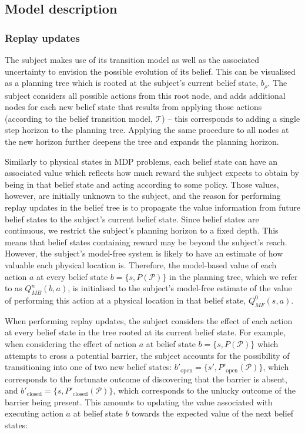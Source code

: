 \subsection*{Model description}

\subsubsection*{Replay updates}

The subject makes use of its transition model as well as the associated uncertainty to envision the possible evolution of its belief. This can be visualised as a planning tree which is rooted at the subject's current belief state, $b_\rho$. The subject considers all possible actions from this root node, and adds additional nodes for each new belief state that results from applying those actions (according to the belief transition model, $\mathcal{T}$) -- this corresponds to adding a single step horizon to the planning tree. Applying the same procedure to all nodes at the new horizon further deepens the tree and expands the planning horizon.

Similarly to physical states in MDP problems, each belief state can have an associated value which reflects how much reward the subject expects to obtain by being in that belief state and acting according to some policy. Those values, however, are initially unknown to the subject, and the reason for performing replay updates in the belief tree is to propagate the value information from future belief states to the subject's current belief state. Since belief states are continuous, we restrict the subject's planning horizon to a fixed depth. This means that belief states containing reward may be beyond the subject's reach. However, the subject's model-free system is likely to have an estimate of how valuable each physical location is. Therefore, the model-based value of each action $a$ at every belief state $b = \{ s, P(\mathcal{P}) \}$ in the planning tree, which we refer to as $Q_{MB}^n(b, a)$, is initialised to the subject's model-free estimate of the value of performing this action at a physical location in that belief state, $Q_{MF}^0(s, a)$.

When performing replay updates, the subject considers the effect of each action at every belief state in the tree rooted at its current belief state. For example, when considering the effect of action $a$ at belief state $b = \{ s, P(\mathcal{P}) \}$ which attempts to cross a potential barrier, the subject accounts for the possibility of transitioning into one of two new belief states: $b'_{\text{open}} = \{ s', P'_{\text{open}}(\mathcal{P}) \}$, which corresponds to the fortunate outcome of discovering that the barrier is absent, and $b'_{\text{closed}} = \{ s, P'_{\text{closed}}(\mathcal{P}) \}$, which corresponds to the unlucky outcome of the barrier being present. This amounts to updating the value associated with executing action $a$ at belief state $b$ towards the expected value of the next belief states:

